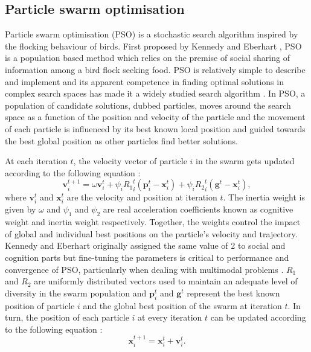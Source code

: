 	
	\subsection{Particle swarm optimisation}
	
	Particle swarm optimisation (PSO) is a stochastic search algorithm inspired by the flocking behaviour of birds. First proposed by Kennedy and Eberhart \cite{Eberhart:1995aa,Kennedy95}, PSO is a population based method which relies on the premise of social sharing of information among a bird flock seeking food. PSO is relatively simple to describe and implement and its apparent competence in finding optimal solutions in complex search spaces has made it a widely studied search algorithm \cite{Freitas:2020aa}. In PSO, a population of candidate solutions, dubbed particles, moves around the search space as a function of the position and velocity of the particle and the movement of each particle is influenced by its best known local position and guided towards the best global position as other particles find better solutions. 

	At each iteration $t$, the velocity vector of particle $i$ in the swarm gets updated according to the following equation \cite{Bonyadi:2017aa}:
	\begin{equation} \label{eq:PSO_vel}
		\mathbf{v}_i^{t+1} = \omega \mathbf{v}_i^{t} + \psi_i {R_1}_i^t \left( \mathbf{p}_i^{t} - \mathbf{x}_i^{t} \right) +\psi_i {R_2}_i^t \left( \mathbf{g}^{t} - \mathbf{x}_i^{t} \right),
	\end{equation}
	where $\mathbf{v}_i^t$ and $\mathbf{x}_i^t$ are the velocity and position at iteration $t$. The inertia weight is given by $\omega$ and $\psi_1$ and $\psi_2$ are real acceleration coefficients known as cognitive weight and inertia weight respectively. Together, the weights control the impact of global and individual best positions on the particle's velocity and trajectory. Kennedy and Eberhart \cite{Kennedy95} originally assigned the same value of \num{2} to social and cognition parts but fine-tuning the parameters is critical to performance and convergence of PSO, particularly when dealing with multimodal problems \cite{Carlisle:2001aa,Trelea:2003aa,van-den-Bergh:2006aa}. $R_1$ and $R_2$ are uniformly distributed vectors used to maintain an adequate level of diversity in the swarm population and $\mathbf{p}_i^{t}$ and $\mathbf{g}^{t}$ represent the best known position of particle $i$ and the global best position of the swarm at iteration $t$. In turn, the position of each particle $i$ at every iteration $t$ can be updated according to the following equation \cite{Bonyadi:2017aa}:
	\begin{equation}  \label{eq:PSO_pos}
		\mathbf{x}_i^{t+1} = \mathbf{x}_i^{t} + \mathbf{v}_i^{t}.
	\end{equation}
	
